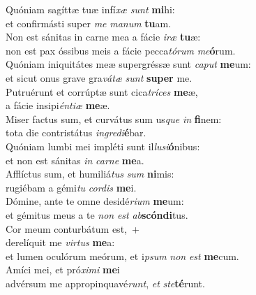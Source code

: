 \evenverse Quóniam sagíttæ tuæ infí\textit{xæ} \textit{sunt} \textbf{mi}hi:~\*\\
\evenverse et confirmásti super \textit{me} \textit{ma}\textit{num} \textbf{tu}am.\\
\oddverse Non est sánitas in carne mea a fácie \textit{i}\textit{ræ} \textbf{tu}æ:~\*\\
\oddverse non est pax óssibus meis a fácie pecca\textit{tó}\textit{rum} \textit{me}\textbf{ó}rum.\\
\evenverse Quóniam iniquitátes meæ supergréssæ sunt \textit{ca}\textit{put} \textbf{me}um:~\*\\
\evenverse et sicut onus grave gra\textit{vá}\textit{tæ} \textit{sunt} \textbf{su}\textbf{per} me.\\
\oddverse Putruérunt et corrúptæ sunt cica\textit{trí}\textit{ces} \textbf{me}æ,~\*\\
\oddverse a fácie insipi\textit{én}\textit{ti}\textit{æ} \textbf{me}æ.\\
\evenverse Miser factus sum, et curvátus sum us\textit{que} \textit{in} \textbf{fi}nem:~\*\\
\evenverse tota die contristátus \textit{in}\textit{gre}\textit{di}\textbf{é}bar.\\
\oddverse Quóniam lumbi mei impléti sunt il\textit{lu}\textit{si}\textbf{ó}nibus:~\*\\
\oddverse et non est sánitas \textit{in} \textit{car}\textit{ne} \textbf{me}a.\\
\evenverse Afflíctus sum, et humiliá\textit{tus} \textit{sum} \textbf{ni}mis:~\*\\
\evenverse rugiébam a gémi\textit{tu} \textit{cor}\textit{dis} \textbf{me}i.\\
\oddverse Dómine, ante te omne desidé\textit{ri}\textit{um} \textbf{me}um:~\*\\
\oddverse et gémitus meus a te \textit{non} \textit{est} \textit{ab}\textbf{scón}\textbf{di}tus.\\
\evenverse Cor meum conturbátum est,~+\\
\evenverse  derelíquit me \textit{vir}\textit{tus} \textbf{me}a:~\*\\
\evenverse et lumen oculórum meórum, et i\textit{psum} \textit{non} \textit{est} \textbf{me}cum.\\
\oddverse Amíci mei, et pró\textit{xi}\textit{mi} \textbf{me}i~\*\\
\oddverse advérsum me appropinquavé\textit{runt}, \textit{et} \textit{ste}\textbf{té}runt.\\
